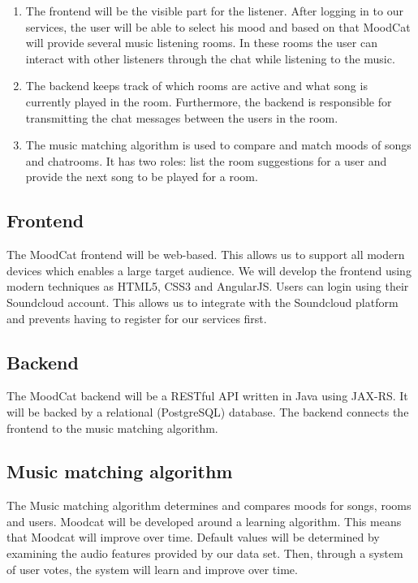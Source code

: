 \documentclass[10pt,a4paper]{article}
\begin{document}
\begin{enumerate}
\item The frontend will be the visible part for the listener.
After logging in to our services, the user will be able to select his mood and based on that MoodCat will provide several music listening rooms.
In these rooms the user can interact with other listeners through the chat while listening to the music.

\item The backend keeps track of which rooms are active and what song is currently played in the room.
Furthermore, the backend is responsible for transmitting the chat messages between the users in the room.

\item The music matching algorithm is used to compare and match moods of songs and chatrooms.
It has two roles: list the room suggestions for a user and provide the next song to be played for a room.
\end{enumerate}

\newpage

\subsection{Frontend}

The MoodCat frontend will be web-based.
This allows us to support all modern devices which enables a large target audience.
We will develop the frontend using modern techniques as HTML5\cite{HTML}, CSS3\cite{CSS} and AngularJS\cite{AngularJS}.
Users can login using their Soundcloud account.
This allows us to integrate with the Soundcloud platform and prevents having to register for our services first.

\subsection{Backend}

The MoodCat backend will be a RESTful\cite{rest} API written in Java using JAX-RS. It will be backed by a relational (PostgreSQL) database. The backend connects the frontend to the music matching algorithm.

\subsection{Music matching algorithm}

The Music matching algorithm determines and compares moods for songs, rooms and users.
Moodcat will be developed around a learning algorithm.
This means that Moodcat will improve over time.
Default values will be determined by examining the audio features provided by our data set.
Then, through a system of user votes, the system will learn and improve over time.
\end{document}
